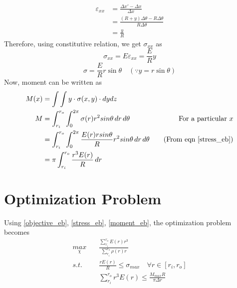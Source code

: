 \documentclass[openright,twoside]{iitkthesis}
\begin{document}
\begin{equation}
\begin{split}
\varepsilon_{xx} &= \frac{\Delta x' - \Delta x}{\Delta x}\\
&= \frac{(R+y)\Delta\theta - R\Delta\theta}{R\Delta\theta}\\
&= \frac{y}{R}
\end{split}
\end{equation}
Therefore, using constitutive relation, we get $\sigma_{xx}$ as
\begin{equation}
\sigma_{xx} = E\varepsilon_{xx} = \frac{E}{R}y
\end{equation}
\begin{equation}\label{stress_eb}
\sigma = \frac{E}{R}r\sin\theta \quad (\because y = r\sin\theta)
\end{equation}
Now, moment can be written as
\begin{equation}\label{moment_eb}
\begin{split}
M(x) &= \int\int y\cdot\sigma(x,y)\cdot dydz\\
M &= \int_{r_i}^{r_o}\int_0^{2\pi}\sigma(r)r^2 sin\theta\,dr\,d\theta & \text{For a particular $x$}\\
&=\int_{r_i}^{r_o}\int_0^{2\pi} \frac{E(r)r sin\theta}{R}r^2 sin\theta\,dr\,d\theta &\quad (\text{From eqn }\eqref{stress_eb})\\
&=\pi\int_{r_i}^{r_o}\frac{r^3 E(r)}{R}\,dr
\end{split}
\end{equation}

\section{Optimization Problem}
Using \eqref{objective_eb}, \eqref{stress_eb}, \eqref{moment_eb}, the optimization problem becomes\\
\begin{equation}
\begin{split}
\underset{\chi}{max} \quad& \frac{\sum^{r_o}_{r_i}E(r)r^3}{\sum^{r_o}_{r_i}\rho(r)r}\\
s.t. \quad& \frac{rE(r)}{R}\leq \sigma_{max} \quad \forall r \in [r_i, r_o]\\
& \sum_{r_i}^{r_o}r^3E(r)\leq \frac{M_{max}R}{\pi\Delta r}
\end{split}
\end{equation}
\end{document}
